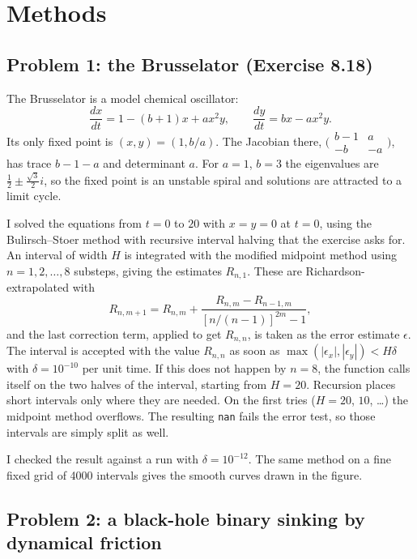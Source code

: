 \documentclass[11pt]{article}
\newcommand{\code}[1]{\texttt{#1}}
\begin{document}
\section*{Methods}

\subsection*{Problem 1: the Brusselator (Exercise 8.18)}

The Brusselator is a model chemical oscillator:
\begin{equation}
\frac{dx}{dt} = 1-(b+1)x+ax^2y, \qquad \frac{dy}{dt} = bx-ax^2y .
\end{equation}
Its only fixed point is $(x,y)=(1,b/a)$. The Jacobian there,
$\bigl(\begin{smallmatrix} b-1 & a\\ -b & -a\end{smallmatrix}\bigr)$, has trace
$b-1-a$ and determinant $a$. For $a=1$, $b=3$ the eigenvalues are
$\tfrac12\pm\tfrac{\sqrt3}{2}i$, so the fixed point is an unstable spiral and
solutions are attracted to a limit cycle.

I solved the equations from $t=0$ to $20$ with $x=y=0$ at $t=0$, using the
Bulirsch--Stoer method with recursive interval halving that the exercise asks
for. An interval of width $H$ is integrated with the modified midpoint method
using $n=1,2,\dots,8$ substeps, giving the estimates $R_{n,1}$. These are
Richardson-extrapolated with
\begin{equation}
R_{n,m+1} = R_{n,m} + \frac{R_{n,m}-R_{n-1,m}}{[n/(n-1)]^{2m}-1},
\end{equation}
and the last correction term, applied to get $R_{n,n}$, is taken as the error
estimate $\epsilon$. The interval is accepted with the value $R_{n,n}$ as soon
as $\max(|\epsilon_x|,|\epsilon_y|) < H\delta$ with
$\delta=10^{-10}$ per unit time. If this does not happen by $n=8$, the function
calls itself on the two halves of the interval, starting from $H=20$.
Recursion places short intervals only where they are needed. On the first
tries ($H=20$, $10$, \dots) the midpoint method overflows. The resulting
\code{nan} fails the error test, so those intervals are simply split as well.

I checked the result against a run with $\delta=10^{-12}$. The same method on a
fine fixed grid of 4000 intervals gives the smooth curves drawn in the figure.

\subsection*{Problem 2: a black-hole binary sinking by dynamical friction}
\end{document}
